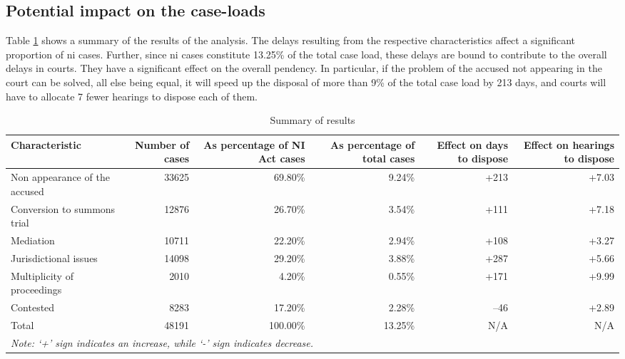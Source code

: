 \subsection{Potential impact on the case-loads} \label{sec:impact-case-loads}

Table \ref{tab:summary_results} shows a summary of the results of the analysis. The delays resulting from the respective characteristics affect a significant proportion of \gls{ni} cases. Further, since \gls{ni} cases constitute 13.25\% of the total case load, these delays are bound to contribute to the overall delays in courts. They have a significant effect on the overall pendency. In particular, if the problem of the accused not appearing in the court can be solved, all else being equal, it will speed up the disposal of more than 9\% of the total case load by 213 days, and courts will have to allocate 7 fewer hearings to dispose each of them.

{\footnotesize \begin{longtable}{@{}p{2.5cm}rrrrr}
 \caption{Summary of results}\label{tab:summary_results}\\
 \toprule
 \textbf{Characteristic} & \multicolumn{1}{p{2cm}}{\textbf{Number of cases}} &
 \multicolumn{1}{p{2cm}}{\textbf{As percentage of NI Act cases}}
 & \multicolumn{1}{p{2cm}}{\textbf{As percentage of total cases}}
 & \multicolumn{1}{p{2cm}}{\textbf{Effect on days to dispose}} &
 \multicolumn{1}{p{2cm}}{\textbf{Effect on hearings to dispose}}
 \\
 \midrule
 Non appearance of the accused & 33625 & 69.80\% & 9.24\% & +213 & +7.03 \\ \midrule
 Conversion to summons trial & 12876 & 26.70\% & 3.54\% & +111 & +7.18 \\ \midrule
 Mediation & 10711 & 22.20\% & 2.94\% & +108 & +3.27 \\ \midrule
 Jurisdictional issues & 14098 & 29.20\% & 3.88\% & +287 & +5.66 \\ \midrule
 Multiplicity of proceedings & 2010 & 4.20\% & 0.55\% & +171 & +9.99 \\ \midrule
 Contested & 8283 & 17.20\% & 2.28\% & --46 & +2.89 \\ \midrule
 Total & 48191 & 100.00\% & 13.25\% & N/A & N/A \\
 \bottomrule
 \multicolumn{6}{l}{{\footnotesize \emph{Note: `+' sign
  indicates an increase, while `-' sign indicates decrease.}}}\\
\end{longtable}
}

